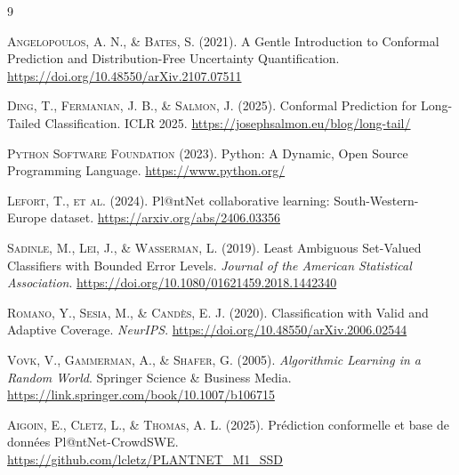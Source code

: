 \documentclass[12pt,a4paper]{article}
\begin{document}
\begin{thebibliography}{9}

\textsc{Angelopoulos, A. N., \& Bates, S.} (2021). A Gentle Introduction to Conformal Prediction and Distribution-Free Uncertainty Quantification. \href{https://doi.org/10.48550/arXiv.2107.07511}{https://doi.org/10.48550/arXiv.2107.07511}

\textsc{Ding, T., Fermanian, J. B., \& Salmon, J.} (2025). Conformal Prediction for Long-Tailed Classification. ICLR 2025. \href{https://josephsalmon.eu/blog/long-tail/}{https://josephsalmon.eu/blog/long-tail/}

\textsc{Python Software Foundation} (2023). Python: A Dynamic, Open Source Programming Language. \href{https://www.python.org/}{https://www.python.org/}

\textsc{Lefort, T., et al.} (2024). Pl@ntNet collaborative learning: South-Western-Europe dataset. \href{https://arxiv.org/abs/2406.03356}{https://arxiv.org/abs/2406.03356}

\textsc{Sadinle, M., Lei, J., \& Wasserman, L.} (2019). Least Ambiguous Set-Valued Classifiers with Bounded Error Levels. \textit{Journal of the American Statistical Association}. \href{https://doi.org/10.1080/01621459.2018.1442340}{https://doi.org/10.1080/01621459.2018.1442340}

\textsc{Romano, Y., Sesia, M., \& Candès, E. J.} (2020). Classification with Valid and Adaptive Coverage. \textit{NeurIPS}. \href{https://doi.org/10.48550/arXiv.2006.02544}{https://doi.org/10.48550/arXiv.2006.02544}

\textsc{Vovk, V., Gammerman, A., \& Shafer, G.} (2005). \textit{Algorithmic Learning in a Random World}. Springer Science \& Business Media. \href{https://link.springer.com/book/10.1007/b106715}{https://link.springer.com/book/10.1007/b106715}

\textsc{Aigoin, E., Cletz, L., \& Thomas, A. L.} (2025). Prédiction conformelle et base de données Pl@ntNet-CrowdSWE. 
\href{https://github.com/lcletz/PLANTNET_M1_SSD}
{https://github.com/lcletz/PLANTNET_M1_SSD}



\end{thebibliography}
\end{document}
